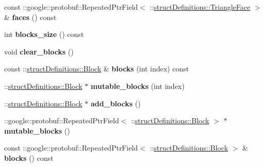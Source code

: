 \begin{DoxyCompactItemize}
const \+::google\+::protobuf\+::\+Repeated\+Ptr\+Field$<$ \+::\hyperlink{classstruct_definitions_1_1_triangle_face}{struct\+Definitions\+::\+Triangle\+Face} $>$ \& {\bfseries faces} () const
\item 
\hypertarget{classstruct_definitions_1_1_data_package_a0c18668003ad474d0321cb311e14d327}{}\label{classstruct_definitions_1_1_data_package_a0c18668003ad474d0321cb311e14d327} 
int {\bfseries blocks\+\_\+size} () const
\item 
\hypertarget{classstruct_definitions_1_1_data_package_ad518ef614761e8ea609f84b4382278b0}{}\label{classstruct_definitions_1_1_data_package_ad518ef614761e8ea609f84b4382278b0} 
void {\bfseries clear\+\_\+blocks} ()
\item 
\hypertarget{classstruct_definitions_1_1_data_package_acec9623aebd37a509888c21d23aa8a1c}{}\label{classstruct_definitions_1_1_data_package_acec9623aebd37a509888c21d23aa8a1c} 
const \+::\hyperlink{classstruct_definitions_1_1_block}{struct\+Definitions\+::\+Block} \& {\bfseries blocks} (int index) const
\item 
\hypertarget{classstruct_definitions_1_1_data_package_a646f659b55af18e8d45cf577045df5d0}{}\label{classstruct_definitions_1_1_data_package_a646f659b55af18e8d45cf577045df5d0} 
\+::\hyperlink{classstruct_definitions_1_1_block}{struct\+Definitions\+::\+Block} $\ast$ {\bfseries mutable\+\_\+blocks} (int index)
\item 
\hypertarget{classstruct_definitions_1_1_data_package_af622e44190a097a9f40f77e8133ff21f}{}\label{classstruct_definitions_1_1_data_package_af622e44190a097a9f40f77e8133ff21f} 
\+::\hyperlink{classstruct_definitions_1_1_block}{struct\+Definitions\+::\+Block} $\ast$ {\bfseries add\+\_\+blocks} ()
\item 
\hypertarget{classstruct_definitions_1_1_data_package_ad5f854fce80ce85a25b94b49e16cfaad}{}\label{classstruct_definitions_1_1_data_package_ad5f854fce80ce85a25b94b49e16cfaad} 
\+::google\+::protobuf\+::\+Repeated\+Ptr\+Field$<$ \+::\hyperlink{classstruct_definitions_1_1_block}{struct\+Definitions\+::\+Block} $>$ $\ast$ {\bfseries mutable\+\_\+blocks} ()
\item 
\hypertarget{classstruct_definitions_1_1_data_package_ad5b6d70a6c196904f2fa8b746bd735ee}{}\label{classstruct_definitions_1_1_data_package_ad5b6d70a6c196904f2fa8b746bd735ee} 
const \+::google\+::protobuf\+::\+Repeated\+Ptr\+Field$<$ \+::\hyperlink{classstruct_definitions_1_1_block}{struct\+Definitions\+::\+Block} $>$ \& {\bfseries blocks} () const
\end{DoxyCompactItemize}
